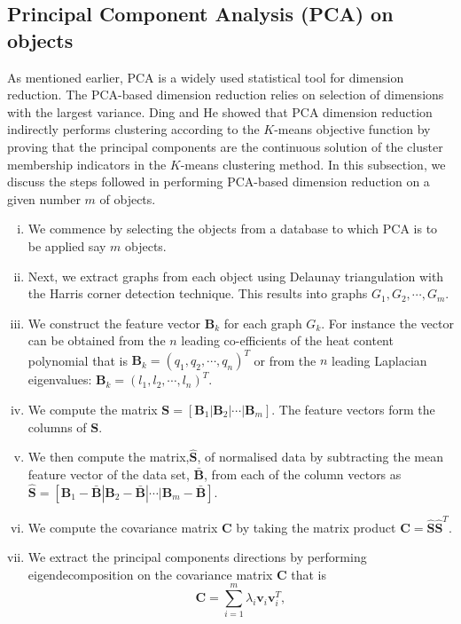 \documentclass[10pt,a4paper]{article}
\theoremstyle{plain}
\theoremstyle{definition}
\begin{document}
\subsection{Principal Component Analysis (PCA) on objects}
As mentioned earlier, PCA is a widely used statistical tool for dimension reduction. The PCA-based dimension reduction relies on selection of dimensions with the largest variance. Ding and He \citep{ding2004k} showed that PCA dimension reduction indirectly performs clustering according to the $K$-means objective function by proving that the principal components are the continuous solution of the cluster membership indicators in the $K$-means clustering method.
In this subsection, we discuss the steps followed in performing  PCA-based dimension reduction on a given number $m$ of objects.
\begin{enumerate}[i)]
	\item We commence by selecting the objects from a database to which PCA is to be applied say $m$ objects.
	\item Next, we extract graphs from each object using Delaunay triangulation with the Harris corner detection technique. This results into graphs $G_1, G_2, \cdots, G_m$.
	\item We construct the feature vector $\mathbf{B}_k$ for each graph $G_k$. For instance the vector can be obtained from the $n$ leading co-efficients of the heat content polynomial that is $\mathbf{B}_k = (q_1,q_2, \cdots, q_n)^T$ or from the $n$ leading Laplacian eigenvalues: $\mathbf{B}_k = (l_1, l_2, \cdots, l_n)^T$.
	\item We compute the matrix $\mathbf{S}=[ \mathbf{B}_1|\mathbf{B}_2| \cdots | \mathbf{B}_m]$. The feature vectors form the columns of $\mathbf{S}$.
	\item We then compute the matrix,$\hat{\mathbf{S}}$, of normalised data by subtracting the mean feature vector of the data set, $\mathbf{\bar{B}}$, from each of the column vectors as  
	$\hat{\mathbf{S}}=[ \mathbf{B}_1-\mathbf{\bar{B}}|\mathbf{B}_2-\mathbf{\bar{B}}| \cdots | \mathbf{B}_m -\mathbf{\bar{B}}]$. 
	\item We compute the covariance matrix $\mathbf{C}$ by taking the matrix product $\mathbf{C} = \hat{\mathbf{S}} \hat{\mathbf{S}}^T$.
	\item We extract the principal components directions by performing eigendecomposition on the covariance matrix $\mathbf{C}$ that is 
	\begin{equation}
	\mathbf{C} = \sum _{i=1} ^m \lambda_i \mathbf{v}_i \mathbf{v}_i^T,

\end{equation}
\end{enumerate}
\end{document}
